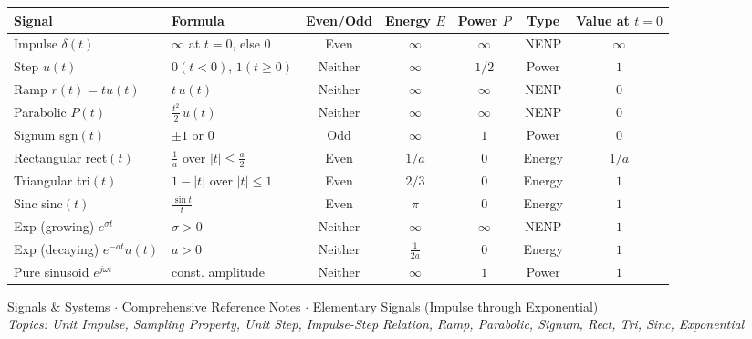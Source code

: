 \documentclass[10pt,a4paper]{article}
\begin{document}
\begin{center}
{\small
\begin{tabular}{@{}l l c c c c c@{}}
\toprule
\textbf{Signal} & \textbf{Formula} & \textbf{Even/Odd} & \textbf{Energy $E$} & \textbf{Power $P$} & \textbf{Type} & \textbf{Value at $t=0$} \\
\midrule
Impulse $\delta(t)$ & $\infty$ at $t=0$, else 0 & Even & $\infty$ & $\infty$ & NENP & $\infty$ \\
Step $u(t)$ & $0(t<0)$, $1(t\geq0)$ & Neither & $\infty$ & $1/2$ & Power & $1$ \\
Ramp $r(t)=tu(t)$ & $t\,u(t)$ & Neither & $\infty$ & $\infty$ & NENP & $0$ \\
Parabolic $P(t)$ & $\tfrac{t^2}{2}\,u(t)$ & Neither & $\infty$ & $\infty$ & NENP & $0$ \\
Signum sgn$(t)$ & $\pm1$ or $0$ & Odd & $\infty$ & $1$ & Power & $0$ \\
Rectangular rect$(t)$ & $\tfrac{1}{a}$ over $|t|\leq\tfrac{a}{2}$ & Even & $1/a$ & $0$ & Energy & $1/a$ \\
Triangular tri$(t)$ & $1-|t|$ over $|t|\leq1$ & Even & $2/3$ & $0$ & Energy & $1$ \\
Sinc sinc$(t)$ & $\frac{\sin t}{t}$ & Even & $\pi$ & $0$ & Energy & $1$ \\
Exp (growing) $e^{\sigma t}$ & $\sigma>0$ & Neither & $\infty$ & $\infty$ & NENP & $1$ \\
Exp (decaying) $e^{-at}u(t)$ & $a>0$ & Neither & $\tfrac{1}{2a}$ & $0$ & Energy & $1$ \\
Pure sinusoid $e^{j\omega t}$ & const. amplitude & Neither & $\infty$ & $1$ & Power & $1$ \\
\bottomrule
\end{tabular}
}
\end{center}

\vspace{6pt}
\begin{center}
{\small\color{gray}
Signals \& Systems $\cdot$ Comprehensive Reference Notes $\cdot$ Elementary Signals (Impulse through Exponential)\\
\textit{Topics: Unit Impulse, Sampling Property, Unit Step, Impulse-Step Relation, Ramp, Parabolic, Signum, Rect, Tri, Sinc, Exponential}
}
\end{center}
\end{document}
